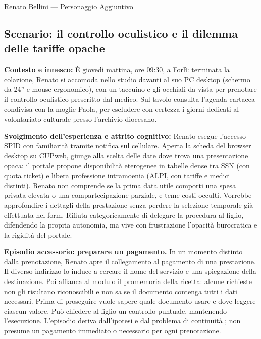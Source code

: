 \begin{personacard}{Renato Bellini --- Personaggio Aggiuntivo}
\end{personacard}

\clearpage

\subsection[Scenario e obiettivo]{Scenario: il controllo oculistico e il dilemma delle tariffe opache}

\textbf{Contesto e innesco:} È giovedì mattina, ore 09:30, a Forlì: terminata la colazione, Renato si accomoda nello studio davanti al suo PC desktop (schermo da 24'' e mouse ergonomico), con un taccuino e gli occhiali da vista per prenotare il controllo oculistico prescritto dal medico. Sul tavolo consulta l'agenda cartacea condivisa con la moglie Paola, per escludere con certezza i giorni dedicati al volontariato culturale presso l'archivio diocesano.

\textbf{Svolgimento dell'esperienza e attrito cognitivo:} Renato esegue l'accesso SPID con familiarità tramite notifica sul cellulare. Aperta la scheda del browser desktop su CUPweb, giunge alla scelta delle date dove trova una presentazione opaca: il portale propone disponibilità eterogenee in tabelle dense tra SSN (con quota ticket) e libera professione intramoenia (ALPI, con tariffe e medici distinti). Renato non comprende se la prima data utile comporti una spesa privata elevata o una compartecipazione parziale, e teme costi occulti. Vorrebbe approfondire i dettagli della prestazione senza perdere la selezione temporale già effettuata nel form. Rifiuta categoricamente di delegare la procedura al figlio, difendendo la propria autonomia, ma vive con frustrazione l'opacità burocratica e la rigidità del portale.

\textbf{Episodio accessorio: preparare un pagamento.} In un momento distinto dalla prenotazione, Renato apre il collegamento al pagamento di una prestazione. Il diverso indirizzo lo induce a cercare il nome del servizio e una spiegazione della destinazione. Poi affianca al modulo il promemoria della ricetta: alcune richieste non gli risultano riconoscibili e non sa se il documento contenga tutti i dati necessari. Prima di proseguire vuole sapere quale documento usare e dove leggere ciascun valore. Può chiedere al figlio un controllo puntuale, mantenendo l'esecuzione. L'episodio deriva dall'ipotesi  e dal problema di continuità ; non presume un pagamento immediato o necessario per ogni prenotazione.

